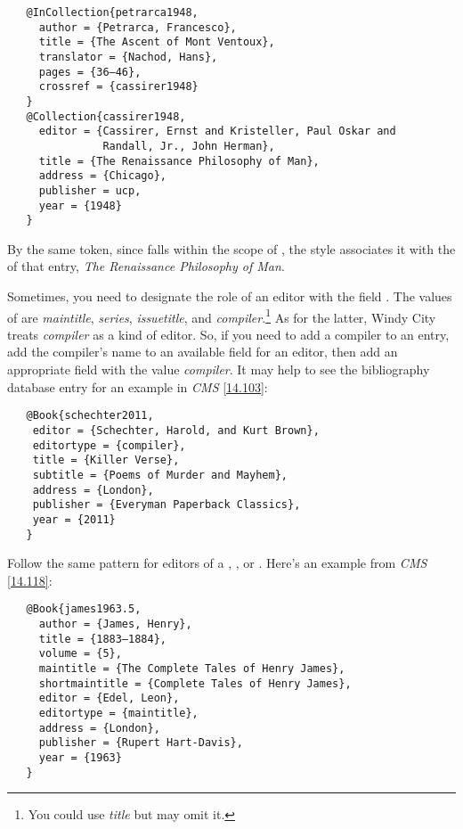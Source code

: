 \documentclass[11pt,letterpaper,oneside]{article}
\begin{document}
\begin{verbatim}
   @InCollection{petrarca1948,
     author = {Petrarca, Francesco},
     title = {The Ascent of Mont Ventoux},
     translator = {Nachod, Hans},
     pages = {36–46},
     crossref = {cassirer1948}
   }
   @Collection{cassirer1948,
     editor = {Cassirer, Ernst and Kristeller, Paul Oskar and
               Randall, Jr., John Herman},
     title = {The Renaissance Philosophy of Man},
     address = {Chicago},
     publisher = ucp,
     year = {1948}
   }
\end{verbatim}

\noindent By the same token, since  falls within the
scope of , the style associates it with the
 of that entry, \textit{The Renaissance Philosophy of
Man}.

Sometimes, you need to designate the role of an editor with the field
. The values of  are
\textit{maintitle}, \textit{series}, \textit{issuetitle}, and
\textit{compiler}.\footnote{You could use \textit{title} but may omit
it.} As for the latter, Windy City treats \textit{compiler} as a kind
of editor. So, if you need to add a compiler to an entry, add the
compiler's name to an available field for an editor, then add an
appropriate  field with the value
\textit{compiler}. It may help to see the bibliography database entry
for an example in \textit{CMS} \ref{14.103}:

\begin{verbatim}
   @Book{schechter2011,
    editor = {Schechter, Harold, and Kurt Brown},
    editortype = {compiler},
    title = {Killer Verse},
    subtitle = {Poems of Murder and Mayhem},
    address = {London},
    publisher = {Everyman Paperback Classics},
    year = {2011}
   }
\end{verbatim}

\begin{citebib}
\item \cite{schechter2011}
\end{citebib}

Follow the same pattern for editors of a ,
, or . Here's an example from
\textit{CMS} \ref{14.118}:

\begin{verbatim}
   @Book{james1963.5,
     author = {James, Henry},
     title = {1883–1884},
     volume = {5},
     maintitle = {The Complete Tales of Henry James},
     shortmaintitle = {Complete Tales of Henry James},
     editor = {Edel, Leon},
     editortype = {maintitle},
     address = {London},
     publisher = {Rupert Hart-Davis},
     year = {1963}
   }
\end{verbatim}
\end{document}
